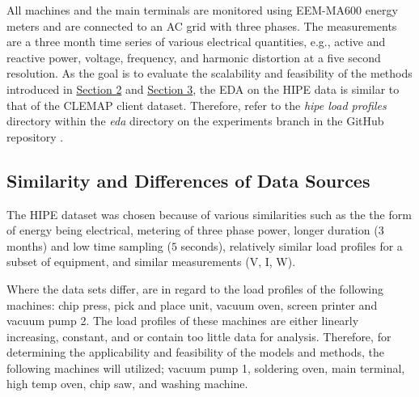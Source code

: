 All machines and the main terminals are monitored using EEM-MA600 energy meters and are connected to an AC grid with three phases. The measurements are a three month time series of various electrical quantities, e.g., active and reactive power, voltage, frequency, and harmonic distortion at a five second resolution. As the goal is to evaluate the scalability and feasibility of the methods introduced in \hyperlink{section.2}{Section 2} and \hyperlink{section.3}{Section 3}, the EDA on the HIPE data is similar to that of the CLEMAP client dataset. Therefore, refer to the \textit{hipe load profiles} directory within the \textit{eda} directory on the experiments branch in the GitHub repository \cite{Stechschulte_Gaussian_Processes_for_2022}. 

\subsection{Similarity and Differences of Data Sources}

The HIPE dataset was chosen because of various similarities such as the the form of energy being electrical, metering of three phase power, longer duration ($3$ months) and low time sampling ($5$ seconds), relatively similar load profiles for a subset of equipment, and similar measurements (V, I, W). 

Where the data sets differ, are in regard to the load profiles of the following machines: chip press, pick and place unit, vacuum oven, screen printer and vacuum pump 2. The load profiles of these machines are either linearly increasing, constant, and or contain too little data for analysis. Therefore, for determining the applicability and feasibility of the models and methods, the following machines will utilized; vacuum pump 1, soldering oven, main terminal, high temp oven, chip saw, and washing machine.
